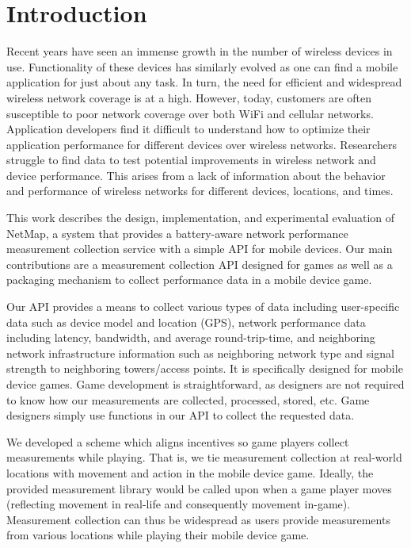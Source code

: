 \section{Introduction}
\label{s:intro}


Recent years have seen an immense growth in the number of wireless devices in use. Functionality of these devices has similarly evolved as one can find a mobile application for just about any task. In turn, the need for efficient and widespread wireless network coverage is at a high. However, today, customers are often susceptible to poor network coverage over both WiFi and cellular networks. Application developers find it difficult to understand how to optimize their application performance for different devices over wireless networks. Researchers struggle to find data to test potential improvements in wireless network and device performance. This arises from a lack of information about the behavior and performance of wireless networks for different devices, locations, and times. 

This work describes the design, implementation, and experimental evaluation of NetMap, a system that provides a battery-aware network performance measurement collection service with a simple API for mobile devices. Our main contributions are a measurement collection API designed for games as well as a packaging mechanism to collect performance data in a mobile device game. 

Our API provides a means to collect various types of data including user-specific data such as device model and location (GPS), network performance data including latency, bandwidth, and average round-trip-time, and neighboring network infrastructure information such as neighboring network type and signal strength to neighboring towers/access points. It is specifically designed for mobile device games. Game development is straightforward, as designers are not required to know how our measurements are collected, processed, stored, etc. Game designers simply use functions in our API to collect the requested data.

We developed a scheme which aligns incentives so game players collect measurements while playing. That is, we tie measurement collection at real-world locations with movement and action in the mobile device game. Ideally, the provided measurement library would be called upon when a game player moves (reflecting movement in real-life and consequently movement in-game). Measurement collection can thus be widespread as users provide measurements from various locations while playing their mobile device game.

